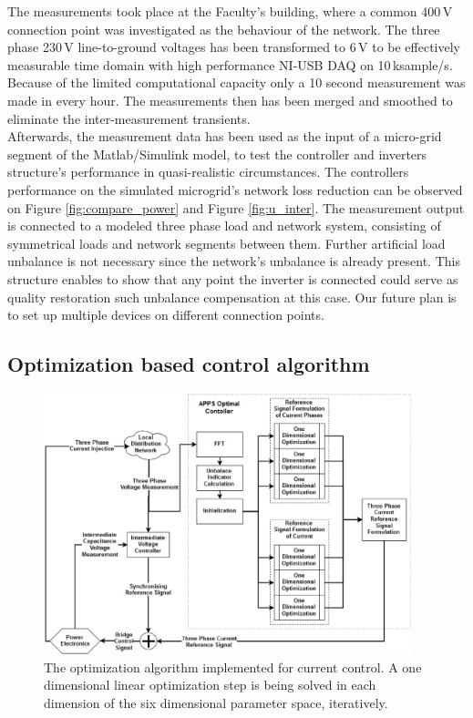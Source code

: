             The measurements took place at the Faculty's building, where a common 400\,V connection point was investigated as the behaviour of the network. The three phase 230\,V line-to-ground voltages has been transformed to 6\,V to be effectively measurable time domain with high performance NI-USB DAQ on 10\,ksample/s. Because of the limited computational capacity only a 10 second measurement was made in every hour.  The measurements then has been merged and smoothed to eliminate the inter-measurement transients.\\
            Afterwards, the measurement data has been used as the input of a micro-grid segment of the Matlab/Simulink model, to test the controller and inverters structure's performance in quasi-realistic circumstances. The controllers performance on the simulated microgrid's network loss reduction can be observed on Figure \ref{fig:compare_power} and Figure \ref{fig:u_inter}. The measurement output is connected to a modeled three phase load and network system, consisting of symmetrical loads and network segments between them. Further artificial load unbalance is not necessary since the network's unbalance is already present. This structure enables to show that any point the inverter is connected could serve as quality restoration such unbalance compensation at this case. Our future plan is to set up multiple devices on different connection points.

    \subsection{Optimization based control algorithm}\label{VUB:sec:Optimization}

        \begin{figure}[ht]
        \centering
        \includegraphics[width=0.95\textwidth]{Unblance_EPS_Pics/APPS_1_2_.eps}
        \caption{The optimization algorithm implemented for current control. A one dimensional linear optimization step is being solved in each dimension of the six dimensional parameter space, iteratively.}
        \label{fig:APPS}
        \end{figure}

